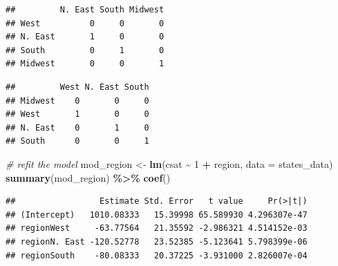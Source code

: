 \documentclass[
]{book}
\newenvironment{Shaded}{\begin{snugshade}}{\end{snugshade}}
\newcommand{\CommentTok}[1]{\textcolor[rgb]{0.56,0.35,0.01}{\textit{#1}}}
\newcommand{\DataTypeTok}[1]{\textcolor[rgb]{0.13,0.29,0.53}{#1}}
\newcommand{\DecValTok}[1]{\textcolor[rgb]{0.00,0.00,0.81}{#1}}
\newcommand{\KeywordTok}[1]{\textcolor[rgb]{0.13,0.29,0.53}{\textbf{#1}}}
\newcommand{\NormalTok}[1]{#1}
\newcommand{\OperatorTok}[1]{\textcolor[rgb]{0.81,0.36,0.00}{\textbf{#1}}}
\newcommand{\StringTok}[1]{\textcolor[rgb]{0.31,0.60,0.02}{#1}}
\begin{document}
\begin{Shaded}
\end{Shaded}

\begin{verbatim}
##         N. East South Midwest
## West          0     0       0
## N. East       1     0       0
## South         0     1       0
## Midwest       0     0       1
\end{verbatim}

\begin{Shaded}
\end{Shaded}

\begin{verbatim}
##         West N. East South
## Midwest    0       0     0
## West       1       0     0
## N. East    0       1     0
## South      0       0     1
\end{verbatim}

\begin{Shaded}
\begin{Highlighting}[]
  \CommentTok{\# refit the model}
\NormalTok{  mod\_region \textless{}{-}}\StringTok{ }\KeywordTok{lm}\NormalTok{(csat }\OperatorTok{\textasciitilde{}}\StringTok{ }\DecValTok{1} \OperatorTok{+}\StringTok{ }\NormalTok{region, }\DataTypeTok{data =}\NormalTok{ states\_data)}
  \KeywordTok{summary}\NormalTok{(mod\_region) }\OperatorTok{\%\textgreater{}\%}\StringTok{ }\KeywordTok{coef}\NormalTok{()}
\end{Highlighting}
\end{Shaded}

\begin{verbatim}
##                 Estimate Std. Error   t value     Pr(>|t|)
## (Intercept)   1010.08333   15.39998 65.589930 4.296307e-47
## regionWest     -63.77564   21.35592 -2.986321 4.514152e-03
## regionN. East -120.52778   23.52385 -5.123641 5.798399e-06
## regionSouth    -80.08333   20.37225 -3.931000 2.826007e-04
\end{verbatim}
\end{document}
